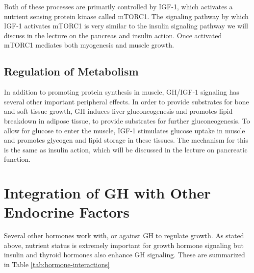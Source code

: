 \documentclass{tufte-handout}
\begin{document}
  Both of these processes are primarily controlled by IGF-1, which activates a nutrient sensing protein kinase called mTORC1.  The signaling pathway by which IGF-1 activates mTORC1 is very similar to the insulin signaling pathway we will discuss in the lecture on the pancreas and insulin action.  Once activated mTORC1 mediates both myogenesis and muscle growth.

\subsection{Regulation of Metabolism}

In addition to promoting protein synthesis in muscle, GH/IGF-1 signaling has several other important peripheral effects.  In order to provide substrates for bone and soft tissue growth, GH induces liver gluconeogenesis and promotes lipid breakdown in adipose tissue, to provide substrates for further gluconeogenesis.  To allow for glucose to enter the muscle, IGF-1 stimulates glucose uptake in muscle and promotes glycogen and lipid storage in these tissues.  The mechanism for this is the same as insulin action, which will be discussed in the lecture on pancreatic function.

\section{Integration of GH with Other Endocrine Factors}

Several other hormones work with, or against GH  to regulate growth.  As stated above, nutrient status is extremely important for growth hormone signaling but insulin and thyroid hormones also enhance GH signaling.  These are summarized in Table \ref{tab:hormone-interactions}
\end{document}
